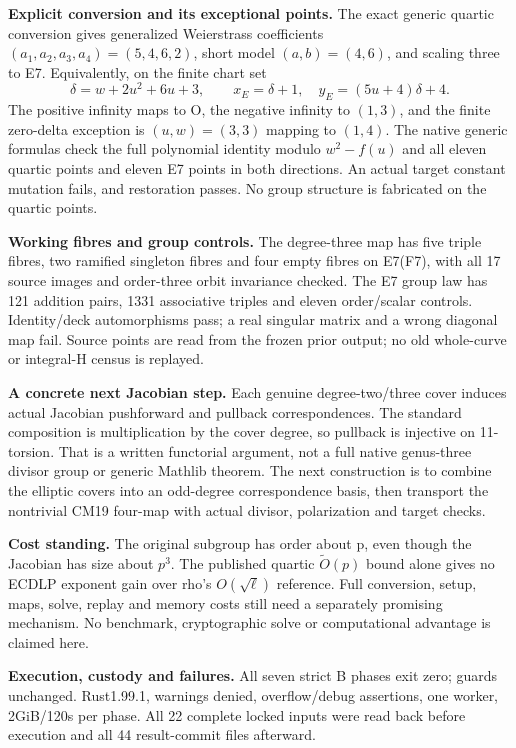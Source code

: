 \documentclass[10pt,a4paper]{article}
\begin{document}
\textbf{Explicit conversion and its exceptional points.}
The exact generic quartic conversion gives generalized Weierstrass
coefficients $(a_1,a_2,a_3,a_4)=(5,4,6,2)$, short model $(a,b)=(4,6)$,
and scaling three to E7. Equivalently, on the finite chart set
\[
 \delta=w+2u^2+6u+3,\qquad
 x_E=\delta+1,\quad y_E=(5u+4)\delta+4.
\]
The positive infinity maps to O, the negative infinity to $(1,3)$,
and the finite zero-delta exception is $(u,w)=(3,3)$ mapping to $(1,4)$.
The native generic formulas check the full polynomial identity modulo
$w^2-f(u)$ and all eleven quartic points and eleven E7 points in both
directions. An actual target constant mutation fails, and restoration passes.
No group structure is fabricated on the quartic points.

\textbf{Working fibres and group controls.}
The degree-three map has five triple fibres, two ramified singleton fibres
and four empty fibres on E7(F7), with all 17 source images and order-three
orbit invariance checked. The E7 group law has 121 addition pairs,
1331 associative triples and eleven order/scalar controls. Identity/deck
automorphisms pass; a real singular matrix and a wrong diagonal map fail.
Source points are read from the frozen prior output; no old whole-curve or
integral-H census is replayed.

\textbf{A concrete next Jacobian step.}
Each genuine degree-two/three cover induces actual Jacobian pushforward and
pullback correspondences. The standard composition is multiplication by
the cover degree, so pullback is injective on 11-torsion. That is a written
functorial argument, not a full native genus-three divisor group or generic
Mathlib theorem. The next construction is to combine the elliptic covers
into an odd-degree correspondence basis, then transport the nontrivial
CM19 four-map with actual divisor, polarization and target checks.

\textbf{Cost standing.}
The original subgroup has order about p, even though the Jacobian has size
about $p^3$. The published quartic $\widetilde O(p)$ bound alone gives no
ECDLP exponent gain over rho's $O(\sqrt\ell)$ reference. Full conversion,
setup, maps, solve, replay and memory costs still need a separately promising
mechanism. No benchmark, cryptographic solve or computational advantage is
claimed here.

\textbf{Execution, custody and failures.}
All seven strict B phases exit zero; guards unchanged. Rust1.99.1,
warnings denied, overflow/debug assertions, one worker, 2GiB/120s per phase.
All 22 complete locked inputs were read back before execution and all 44
result-commit files afterward.
\end{document}
